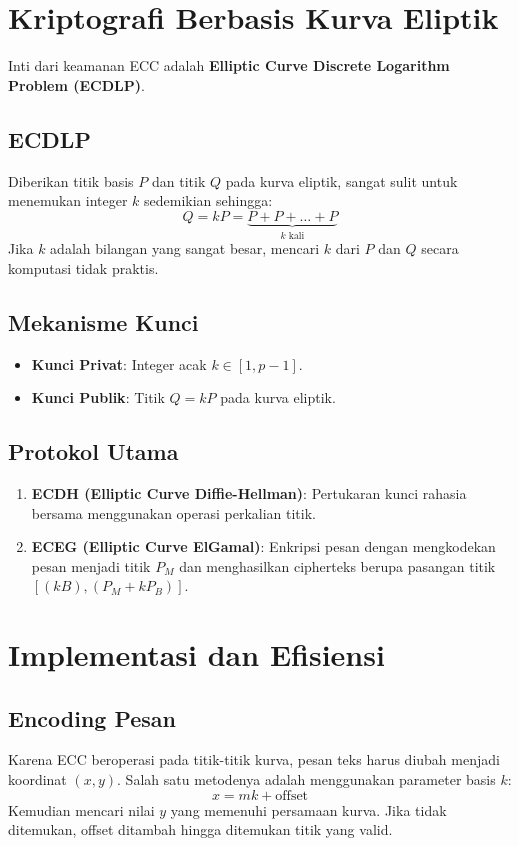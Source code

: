 \documentclass[../main.tex]{subfiles}
\begin{document}
\section{Kriptografi Berbasis Kurva Eliptik}
Inti dari keamanan ECC adalah \textbf{Elliptic Curve Discrete Logarithm Problem (ECDLP)}.

\subsection{ECDLP}
Diberikan titik basis $P$ dan titik $Q$ pada kurva eliptik, sangat sulit untuk menemukan integer $k$ sedemikian sehingga:
\[ Q = kP = \underbrace{P + P + \dots + P}_{k \text{ kali}} \]
Jika $k$ adalah bilangan yang sangat besar, mencari $k$ dari $P$ dan $Q$ secara komputasi tidak praktis.

\subsection{Mekanisme Kunci}
\begin{itemize}
    \item \textbf{Kunci Privat}: Integer acak $k \in [1, p-1]$.
    \item \textbf{Kunci Publik}: Titik $Q = kP$ pada kurva eliptik.
\end{itemize}

\subsection{Protokol Utama}
\begin{enumerate}
    \item \textbf{ECDH (Elliptic Curve Diffie-Hellman)}: Pertukaran kunci rahasia bersama menggunakan operasi perkalian titik.
    \item \textbf{ECEG (Elliptic Curve ElGamal)}: Enkripsi pesan dengan mengkodekan pesan menjadi titik $P_M$ dan menghasilkan cipherteks berupa pasangan titik $[(kB), (P_M + kP_B)]$.
\end{enumerate}

\section{Implementasi dan Efisiensi}
\subsection{Encoding Pesan}
Karena ECC beroperasi pada titik-titik kurva, pesan teks harus diubah menjadi koordinat $(x, y)$. Salah satu metodenya adalah menggunakan parameter basis $k$:
\[ x = mk + \text{offset} \]
Kemudian mencari nilai $y$ yang memenuhi persamaan kurva. Jika tidak ditemukan, offset ditambah hingga ditemukan titik yang valid.
\end{document}
